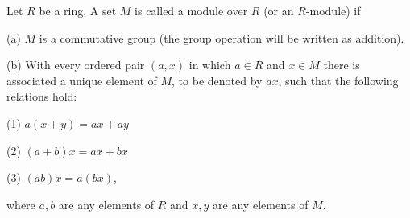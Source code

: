Let $R$ be a ring. A set $M$ is called a module over $R$ (or an $R$-module) if

(a) $M$ is a commutative group (the group operation will be written as addition).

(b) With every ordered pair $(a, x)$ in which $a \in R$ and $x \in M$ there is associated a unique element of $M$, to be denoted by $ax$, such that the following relations hold:

(1) $a(x + y) = ax + ay$

(2) $(a + b)x = ax + bx$

(3) $(ab)x = a(bx)$,

where $a, b$ are any elements of $R$ and $x, y$ are any elements of $M$.

